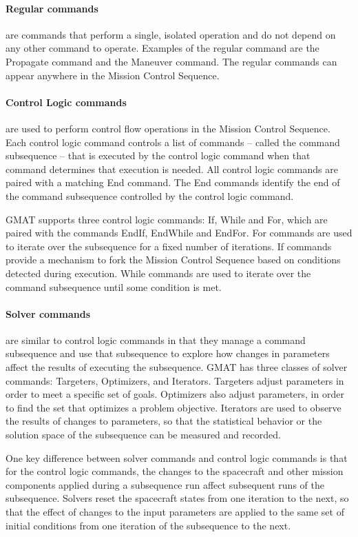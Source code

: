 \paragraph{Regular commands} are commands that perform a single, isolated operation and do not
depend on any other command to operate.  Examples of the regular command are the Propagate command
and the Maneuver command.  The regular commands can appear anywhere in the Mission Control Sequence.

\paragraph{Control Logic commands} are used to perform control flow operations in the Mission
Control Sequence.  Each control logic command controls a list of commands -- called the command
subsequence -- that is executed by the control logic command when that command determines that
execution is needed.  All control logic commands are paired with a matching End command.  The End
commands identify the end of the command subsequence controlled by the control logic command.

GMAT supports three control logic commands: If, While and For, which are paired with the commands
EndIf, EndWhile and EndFor.  For commands are used to iterate over the subsequence for a fixed
number of iterations.  If commands provide a mechanism to fork the Mission Control Sequence based on
conditions detected during execution.  While commands are used to iterate over the command
subsequence until some condition is met.

\paragraph{Solver commands} are similar to control logic commands in that they manage a command
subsequence and use that subsequence to explore how changes in parameters affect the results of
executing the subsequence.  GMAT has three classes of solver commands: Targeters, Optimizers, and
Iterators.  Targeters adjust parameters in order to meet a specific set of goals.  Optimizers also
adjust parameters, in order to find the set that optimizes a problem objective.  Iterators are used
to observe the results of changes to parameters, so that the statistical behavior or the solution
space of the subsequence can be measured and recorded.

One key difference between solver commands and control logic commands is that for the control logic
commands, the changes to the spacecraft and other mission components applied during a subsequence
run affect subsequent runs of the subsequence.  Solvers reset the spacecraft states from one
iteration to the next, so that the effect of changes to the input parameters are applied to the same
set of initial conditions from one iteration of the subsequence to the next.

